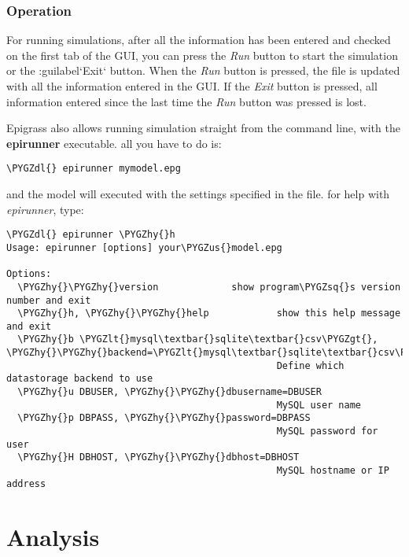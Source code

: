 \documentclass[a4paper,10pt,english]{sphinxmanual}
\def\PYGZus{\char`\_}
\def\PYGZlt{\char`\<}
\def\PYGZgt{\char`\>}
\def\PYGZdl{\char`\$}
\def\PYGZhy{\char`\-}
\def\PYGZsq{\char`\'}
\begin{document}
\subsection{Operation}
\label{using:operation}
For running simulations, after all the information has been entered and checked on the first tab of the GUI, you can press the \emph{Run} button to start the simulation or the :guilabel{}`Exit{}` button. When the \emph{Run} button is pressed, the  file is updated with all the information entered in the GUI. If the \emph{Exit} button is pressed, all information entered since the last time the \emph{Run} button was pressed is lost.

Epigrass also allows running simulation straight from the command line, with the \textbf{epirunner} executable. all you have to do is:

\begin{Verbatim}[commandchars=\\\{\}]
\PYGZdl{} epirunner mymodel.epg
\end{Verbatim}

and the model will executed with the settings specified in the  file. for help with \emph{epirunner}, type:

\begin{Verbatim}[commandchars=\\\{\}]
\PYGZdl{} epirunner \PYGZhy{}h
Usage: epirunner [options] your\PYGZus{}model.epg

Options:
  \PYGZhy{}\PYGZhy{}version             show program\PYGZsq{}s version number and exit
  \PYGZhy{}h, \PYGZhy{}\PYGZhy{}help            show this help message and exit
  \PYGZhy{}b \PYGZlt{}mysql\textbar{}sqlite\textbar{}csv\PYGZgt{}, \PYGZhy{}\PYGZhy{}backend=\PYGZlt{}mysql\textbar{}sqlite\textbar{}csv\PYGZgt{}
                                                Define which datastorage backend to use
  \PYGZhy{}u DBUSER, \PYGZhy{}\PYGZhy{}dbusername=DBUSER
                                                MySQL user name
  \PYGZhy{}p DBPASS, \PYGZhy{}\PYGZhy{}password=DBPASS
                                                MySQL password for user
  \PYGZhy{}H DBHOST, \PYGZhy{}\PYGZhy{}dbhost=DBHOST
                                                MySQL hostname or IP address
\end{Verbatim}


\chapter{Analysis}
\label{analysis:id1}\label{analysis::doc}\label{analysis:analysis}
\end{document}
